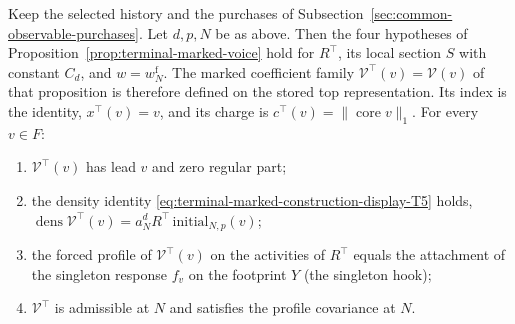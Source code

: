 \begin{proposition}
\label{prop:selected-terminal-voice}
Keep the selected history and the purchases of
Subsection~\ref{sec:common-observable-purchases}. Let $d,p,N$ be as above.
Then the four hypotheses of Proposition~\ref{prop:terminal-marked-voice}
hold for $R^\top$, its local section $S$ with constant $C_d$, and
$w=w^{\mathrm f}_N$. The marked coefficient family
$\mathcal V^\top(v)=\mathcal V(v)$ of that proposition is therefore
defined on the stored top representation. Its index is the identity,
$x^\top(v)=v$, and its charge is $c^\top(v)=\|\operatorname{core}v\|_1$.
For every $v\in F$:
\begin{enumerate}
\item $\mathcal V^\top(v)$ has lead $v$ and zero regular part;
\item the density identity \eqref{eq:terminal-marked-construction-display-T5} holds,
  $\operatorname{dens}\mathcal V^\top(v)=a_N^dR^\top\,
  \mathrm{initial}_{N,p}(v)$;
\item the forced profile of $\mathcal V^\top(v)$ on the activities of
  $R^\top$ equals the attachment of the singleton response $f_v$ on the
  footprint $Y$ (the singleton hook);
\item $\mathcal V^\top$ is admissible at $N$ and satisfies the profile
  covariance at $N$.
\end{enumerate}
\end{proposition}

